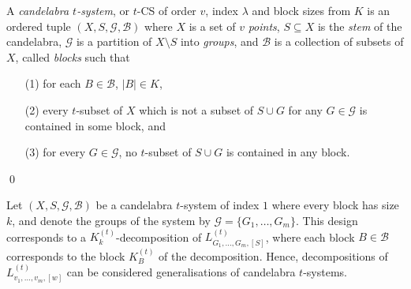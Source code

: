 \begin{definition}
A {\em candelabra $t$-system}, or $t$-CS of order $v$, index $\lambda$ and block sizes from $K$ is an ordered tuple $(X, S, \mathcal{G}, \mathcal{B})$ where $X$ is a set of $v$ {\em points}, $S \subseteq X$ is the {\em stem} of the candelabra, $\mathcal{G}$ is a partition of $X \setminus S$ into {\em groups}, and $\mathcal{B}$ is a collection of subsets of $X$, called {\em blocks} such that
\begin{enumerate}
    \item[(1)] for each $B \in \mathcal{B}$, $|B| \in K$,
    \item[(2)] every $t$-subset of $X$ which is not a subset of $S \cup G$ for any $G \in \mathcal{G}$ is contained in some block, and
    \item[(3)] for every $G \in \mathcal{G}$, no $t$-subset of $S \cup G$ is contained in any block.
\end{enumerate}
\qed
\end{definition}

Let $(X, S, \mathcal{G}, \mathcal{B})$ be a candelabra $t$-system of index $1$ where every block has size $k$, and denote the groups of the system by $\mathcal{G} = \{G_1, \ldots, G_m\}$.
This design corresponds to a $K_{k}^{(t)}$-decomposition of $L_{G_1,\ldots,G_m,[S]}^{(t)}$, where each block $B \in \mathcal{B}$ corresponds to the block $K_{B}^{(t)}$ of the decomposition.
Hence, decompositions of $L_{v_1, \ldots, v_m,[w]}^{(t)}$ can be considered generalisations of candelabra $t$-systems.
